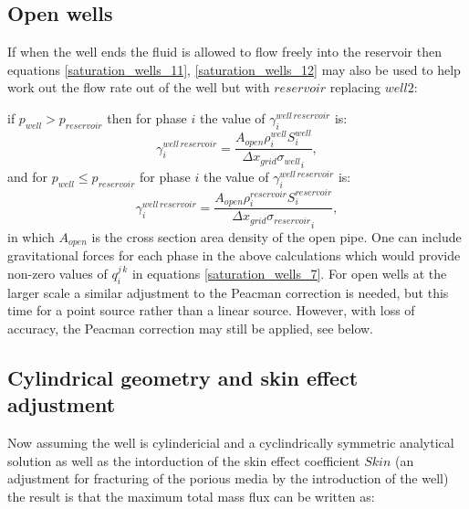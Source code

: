 \subsection{Open wells}
\label{Mass flow rate between wells}
If when the well ends the fluid is allowed to flow freely into the reservoir
then equations \ref{saturation_wells_11}, \ref{saturation_wells_12}
may also be used to help work out the flow rate out of the well but with $reservoir$ replacing $well2$:

\par\noindent
if $p_{well}>p_{reservoir}$ then for phase $i$ the value of $\gamma_i^{well\, reservoir}$ is:
\begin{equation}
\gamma_{i}^{well\, reservoir}=\frac{ A_{open}  \rho_i^{well} S_i^{well} }{{{\Delta x}_{grid}\sigma_{well}}_i} ,
\label{saturation_wells_11}
\end{equation}
and for $p_{well}\leq p_{reservoir}$ for phase $i$ the value of $\gamma_i^{well\, reservoir}$ is:
\begin{equation}
\gamma_{i}^{well\, reservoir}=\frac{ A_{open}  \rho_i^{reservoir} S_i^{reservoir} }{{{\Delta x}_{grid}\sigma_{reservoir}}_i} ,
\label{saturation_wells_15-well10reservoir}
\end{equation}
in which $A_{open}$ is the cross section area density of the open pipe. One can include
gravitational forces for each phase in the above calculations which would provide non-zero values
of $q_i^{j\,k}$ in equations \ref{saturation_wells_7}.
For open wells at the larger scale a similar adjustment to the
Peacman correction is needed, but this time for a point source rather than a linear source.
However, with loss of accuracy, the Peacman correction may still be applied, see below.




\subsection{Cylindrical geometry and skin effect adjustment}

Now assuming the well is cylindericial and a cyclindrically symmetric analytical solution
as well as the intorduction of the skin effect coefficient $Skin$ (an adjustment for fracturing of the porious media by the introduction of the well) the result is that the maximum total mass flux can
be written as:

